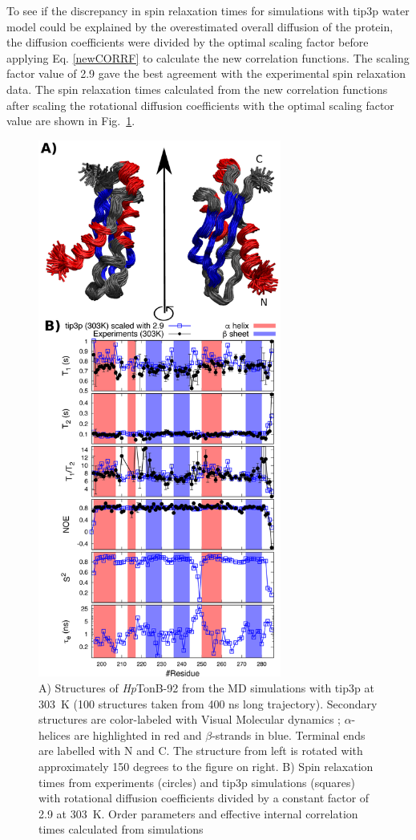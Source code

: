 \documentclass[journal=jpcbfk,manuscript=article]{achemso}
\begin{document}
To see if the discrepancy in spin relaxation times for simulations with tip3p water model
could be explained by the overestimated overall diffusion of the protein,
the diffusion coefficients were divided by the optimal scaling factor
before applying Eq. \ref{newCORRF} to calculate the new correlation functions.
The scaling factor value of 2.9 gave the best agreement with the experimental spin relaxation data.
The spin relaxation times calculated from the new correlation functions after scaling
the rotational diffusion coefficients with the optimal scaling factor value are shown in Fig.~\ref{HpTonBrelaxationDATAscaled}.
\begin{figure}[!h]
  \includegraphics[width=8.0cm]{../Figs/RELdataHpTonB2.eps}%
  \caption{A) Structures of {\it Hp}TonB-92 from the MD simulations with tip3p at 303~K
    (100 structures taken from 400 ns long trajectory). Secondary structures
    are color-labeled with Visual Molecular dynamics \cite{frishman95,humphrey96};
    $\alpha$-helices are highlighted in red and $\beta$-strands in blue.
    Terminal ends are labelled with N and C.
    The structure from left is rotated with approximately 150 degrees to the figure on right.
    B) Spin relaxation times from experiments (circles) and tip3p
    simulations (squares) with rotational diffusion coefficients divided by a
    constant factor of 2.9 at 303~K. Order parameters and effective internal correlation
    times calculated from simulations
    \label{HpTonBrelaxationDATAscaled}}%
\end{figure}
\end{document}
